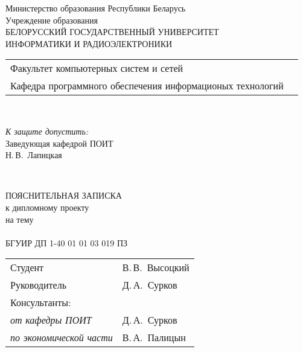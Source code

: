 \begin{titlepage}
  \begin{center}
    Министерство образования Республики Беларусь\\[1em]
    Учреждение образования\\
    БЕЛОРУССКИЙ ГОСУДАРСТВЕННЫЙ УНИВЕРСИТЕТ \\
    ИНФОРМАТИКИ И РАДИОЭЛЕКТРОНИКИ\\[1em]

    \begin{minipage}{\textwidth}
      \begin{flushleft}
        \begin{tabular}{ l l }
          Факультет компьютерных систем и сетей\\
          Кафедра программного обеспечения информационых технологий
        \end{tabular}
      \end{flushleft}
    \end{minipage}\\[1em]

    \begin{flushright}
      \begin{minipage}{0.4\textwidth}
        \textit{К защите допустить:}\\[0.8em]
        Заведующая кафедрой ПОИТ\\[0.45em]
        \underline{\hspace*{2.8cm}} Н.\,В.~Лапицкая
      \end{minipage}\\[2.2em]
    \end{flushright}

    {ПОЯСНИТЕЛЬНАЯ ЗАПИСКА}\\
    {к дипломному проекту}\\
    {на тему}\\[1em]
    \textbf{\large \thesis{}}\\[1em]


    {БГУИР ДП 1-40 01 01 03 019 ПЗ}\\[2em]
    
    \begin{tabular}{ p{}p{} }
      Студент & В.\,В.~Высоцкий \\
      Руководитель & Д.\,А.~Сурков \\
      Консультанты: &\\
      \hspace*{3ex}\emph{от кафедры ПОИТ} & Д.\,А.~Сурков \\
      \hspace*{3ex}\emph{по экономической части} & В.\,А.~Палицын \\


\end{tabular}
\end{center}
\end{titlepage}
